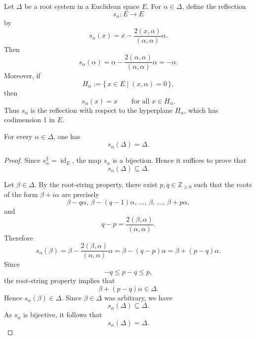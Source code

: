 Let \(\Delta\) be a root system in a Euclidean space \(E\). For
\(\alpha\in\Delta\), define the reflection
\[
    s_\alpha:E\longrightarrow E
\]
by
\[
    s_\alpha(x)
    =
    x-\frac{2(x,\alpha)}{(\alpha,\alpha)}\alpha.
\]
Then
\[
    s_\alpha(\alpha)
    =
    \alpha-\frac{2(\alpha,\alpha)}{(\alpha,\alpha)}\alpha
    =
    -\alpha.
\]
Moreover, if
\[
    H_\alpha
    :=
    \{\,x\in E\mid (x,\alpha)=0\,\},
\]
then
\[
    s_\alpha(x)=x
    \qquad
    \text{for all }x\in H_\alpha.
\]
Thus \(s_\alpha\) is the reflection with respect to the hyperplane
\(H_\alpha\), which has codimension \(1\) in \(E\).

\begin{lemma}
    For every \(\alpha\in\Delta\), one has
    \[
        s_\alpha(\Delta)=\Delta.
    \]
\end{lemma}

\begin{proof}
    Since \(s_\alpha^2=\operatorname{id}_E\), the map \(s_\alpha\) is a bijection.
    Hence it suffices to prove that
    \[
        s_\alpha(\Delta)\subseteq \Delta.
    \]

    Let \(\beta\in\Delta\). By the root-string property, there exist
    \(p,q\in\mathbb{Z}_{\geq 0}\) such that the roots of the form
    \(\beta+i\alpha\) are precisely
    \[
        \beta-q\alpha,\,
        \beta-(q-1)\alpha,\,
        \ldots,\,
        \beta,\,
        \ldots,\,
        \beta+p\alpha,
    \]
    and
    \[
        q-p
        =
        \frac{2(\beta,\alpha)}{(\alpha,\alpha)}.
    \]
    Therefore
    \[
        s_\alpha(\beta)
        =
        \beta-\frac{2(\beta,\alpha)}{(\alpha,\alpha)}\alpha
        =
        \beta-(q-p)\alpha
        =
        \beta+(p-q)\alpha.
    \]
    Since
    \[
        -q\leq p-q\leq p,
    \]
    the root-string property implies that
    \[
        \beta+(p-q)\alpha\in\Delta.
    \]
    Hence \(s_\alpha(\beta)\in\Delta\). Since \(\beta\in\Delta\) was arbitrary,
    we have
    \[
        s_\alpha(\Delta)\subseteq\Delta.
    \]
    As \(s_\alpha\) is bijective, it follows that
    \[
        s_\alpha(\Delta)=\Delta.
    \]
\end{proof}

